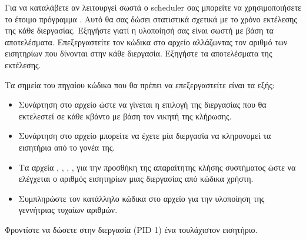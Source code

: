 \documentclass[18pt]{extarticle}
\begin{document}
\begin{question}
    Για να καταλάβετε αν λειτουργεί σωστά ο scheduler σας μπορείτε να χρησιμοποιήσετε 
    το έτοιμο πρόγραμμα . Αυτό θα σας δώσει στατιστικά σχετικά με το χρόνο εκτέλεσης 
    της κάθε διεργασίας. Εξηγήστε γιατί η υλοποίησή σας είναι σωστή με βάση τα αποτελέσματα.
    Επεξεργαστείτε τον κώδικα στο αρχείο  αλλάζωντας τον αριθμό των εισητηρίων 
    που δίνονται στην κάθε διεργασία. Εξηγήστε τα αποτελέσματα της εκτέλεσης.

    \begin{info}[Βοήθεια:]
        Τα σημεία του πηγαίου κώδικα που θα πρέπει να επεξεργαστείτε είναι τα εξής: 
        
        \begin{itemize}
            \item Συνάρτηση  στο αρχείο  ώστε να γίνεται η επιλογή της διεργασίας που θα εκτελεστεί σε κάθε κβάντο με βάση τον νικητή της κλήρωσης.
            \item Συνάρτηση  στο αρχείο  μπορείτε να έχετε μία διεργασία να κληρονομεί τα εισητήρια από το γονέα της.
            \item Τα αρχεία , , , ,  
                για την προσθήκη της απαραίτητης κλήσης συστήματος ώστε να ελέγχεται ο αριθμός εισητηρίων μιας διεργασίας από κώδικα χρήστη.
            \item Συμπληρώστε τον κατάλληλο κώδικα στο αρχείο  για την υλοποίηση της γεννήτριας τυχαίων αριθμών.
        \end{itemize}

        Φροντίστε να δώσετε στην διεργασία  (PID 1) ένα τουλάχιστον εισητήριο.
    \end{info}

\end{question}

\printbibliography
\end{document}
